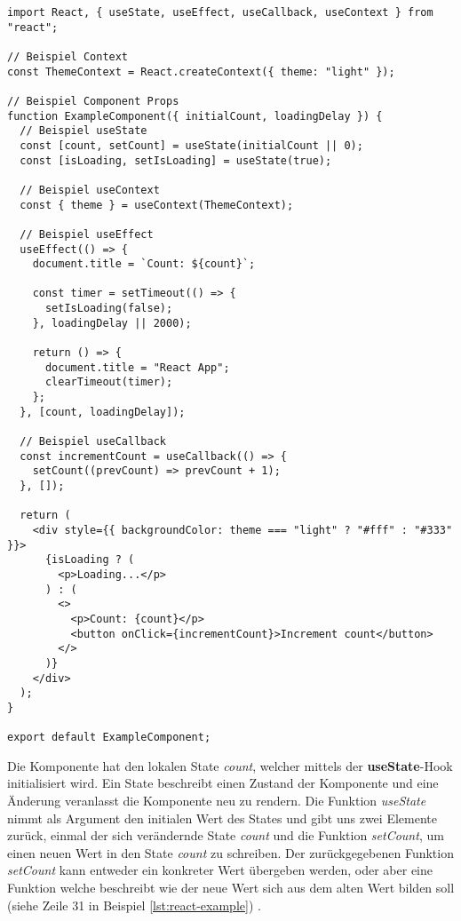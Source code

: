 \begin{lstlisting}[style=codeStyle, caption={Beispiel einer React Komponente}, label={lst:react-example}]
import React, { useState, useEffect, useCallback, useContext } from "react";

// Beispiel Context
const ThemeContext = React.createContext({ theme: "light" });

// Beispiel Component Props
function ExampleComponent({ initialCount, loadingDelay }) {
  // Beispiel useState
  const [count, setCount] = useState(initialCount || 0);
  const [isLoading, setIsLoading] = useState(true);

  // Beispiel useContext
  const { theme } = useContext(ThemeContext);

  // Beispiel useEffect
  useEffect(() => {
    document.title = `Count: ${count}`;

    const timer = setTimeout(() => {
      setIsLoading(false);
    }, loadingDelay || 2000);

    return () => {
      document.title = "React App";
      clearTimeout(timer);
    };
  }, [count, loadingDelay]);
  
  // Beispiel useCallback
  const incrementCount = useCallback(() => {
    setCount((prevCount) => prevCount + 1);
  }, []);

  return (
    <div style={{ backgroundColor: theme === "light" ? "#fff" : "#333" }}>
      {isLoading ? (
        <p>Loading...</p>
      ) : (
        <>
          <p>Count: {count}</p>
          <button onClick={incrementCount}>Increment count</button>
        </>
      )}
    </div>
  );
}

export default ExampleComponent;
\end{lstlisting}

Die Komponente hat den lokalen State \textit{count}, welcher mittels der \textbf{useState}-Hook initialisiert wird. Ein State beschreibt einen Zustand der Komponente und eine Änderung veranlasst die Komponente neu zu rendern. Die Funktion \textit{useState} nimmt als Argument den initialen Wert des States und gibt uns zwei Elemente zurück, einmal der sich verändernde State \textit{count} und die Funktion \textit{setCount}, um einen neuen Wert in den State \textit{count} zu schreiben. Der zurückgegebenen Funktion \textit{setCount} kann entweder ein konkreter Wert übergeben werden, oder aber eine Funktion welche beschreibt wie der neue Wert sich aus dem alten Wert bilden soll (siehe Zeile 31 in Beispiel \ref{lst:react-example}) \cite{react-key-concepts}.

